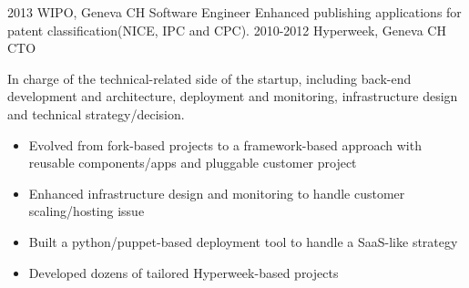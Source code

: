\documentclass[]{friggeri}
\begin{document}
\begin{entrylist}
{\begin{itemize}
    \end{itemize}}
  \entry
    {2013}
    {\ac{WIPO}, Geneva CH}
    {Software Engineer}
    {Enhanced publishing applications for patent classification(NICE, IPC
    and CPC).}
  \entry
    {2010-2012}
    {Hyperweek, Geneva CH}
    {\ac{CTO}}
    {In charge of the technical-related side of the startup, including
    back-end development and architecture, deployment and monitoring,
    infrastructure design and technical strategy/decision.
    \begin{itemize}
    \item Evolved from fork-based projects to a framework-based approach with
    reusable components/apps and pluggable customer project
    \item Enhanced infrastructure design and monitoring to handle customer
    scaling/hosting issue
    \item Built a python/puppet-based deployment tool to handle a SaaS-like
    strategy
    \item Developed dozens of tailored Hyperweek-based projects
    \end{itemize}}
\end{entrylist}

\clearpage
\end{document}
